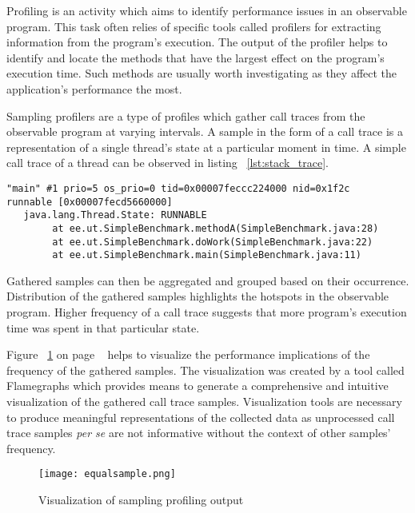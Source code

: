 \documentclass[..thesis.tex]{subfiles}
\begin{document}
Profiling is an activity which aims to identify performance issues in an observable program. This task often relies of specific tools called profilers for extracting information from the program's execution. The output of the profiler helps to identify and locate the methods that have the largest effect on the program's execution time. Such methods are usually worth investigating as they affect the application's performance the most. \cite{mytkowicz_evaluating_2010}

Sampling profilers are a type of profiles which gather call traces from the observable program at varying intervals. A sample in the form of a call trace is a representation of a single thread's state at a particular moment in time. A simple call trace of a thread can be observed in listing ~\ref{lst:stack_trace}. 

\begin{lstlisting}[style=def,label={lst:stack_trace}, caption={Call trace of a thread}]
"main" #1 prio=5 os_prio=0 tid=0x00007feccc224000 nid=0x1f2c 
runnable [0x00007fecd5660000]
   java.lang.Thread.State: RUNNABLE
	    at ee.ut.SimpleBenchmark.methodA(SimpleBenchmark.java:28)
    	at ee.ut.SimpleBenchmark.doWork(SimpleBenchmark.java:22)
	    at ee.ut.SimpleBenchmark.main(SimpleBenchmark.java:11)
\end{lstlisting}

Gathered samples can then be aggregated and grouped based on their occurrence.
Distribution of the gathered samples highlights the hotspots in the observable program. Higher frequency of a call trace suggests that more program's execution time was spent in that particular state. 

Figure ~\ref{fig:samplingProf} on page ~\pageref{fig:samplingProf} helps to visualize the performance implications of the frequency of the gathered samples. The visualization was created by a tool called Flamegraphs which provides means to generate a comprehensive and intuitive visualization of the gathered call trace samples. \cite{gregg_flame} Visualization tools are necessary to produce meaningful representations of the collected data as unprocessed call trace samples \textit{per se} are not informative without the context of other samples' frequency.

\begin{figure}[H]
\texttt{[image: equalsample.png]}
\caption{Visualization of sampling profiling output}
\label{fig:samplingProf}
\end{figure}
\end{document}
